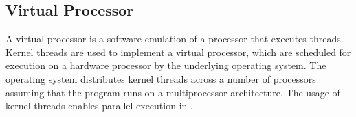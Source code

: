 \subsection{Virtual Processor}
A virtual processor is a software emulation of a processor that executes
threads. Kernel threads are used to implement a virtual processor, which are
scheduled for execution on a hardware processor by the underlying operating
system. The operating system distributes kernel threads across a number of
processors assuming that the program runs on a multiprocessor architecture. The
usage of kernel threads enables parallel execution in \uCPP.

